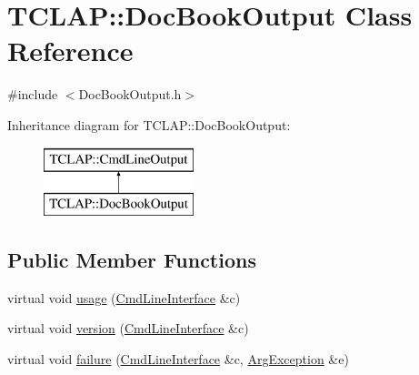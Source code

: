 \hypertarget{class_t_c_l_a_p_1_1_doc_book_output}{}\section{T\+C\+L\+A\+P\+:\+:Doc\+Book\+Output Class Reference}
\label{class_t_c_l_a_p_1_1_doc_book_output}


{\ttfamily \#include $<$Doc\+Book\+Output.\+h$>$}

Inheritance diagram for T\+C\+L\+A\+P\+:\+:Doc\+Book\+Output\+:\begin{figure}[H]
\begin{center}
\leavevmode
\includegraphics[height=2.000000cm]{class_t_c_l_a_p_1_1_doc_book_output}
\end{center}
\end{figure}
\subsection*{Public Member Functions}
\begin{DoxyCompactItemize}
\item 
virtual void \hyperlink{class_t_c_l_a_p_1_1_doc_book_output_adc1ec93f3f7e5e912690be01c5e7d6e2}{usage} (\hyperlink{class_t_c_l_a_p_1_1_cmd_line_interface}{Cmd\+Line\+Interface} \&c)
\item 
virtual void \hyperlink{class_t_c_l_a_p_1_1_doc_book_output_a3ccf7671dcae82aba5f0e91850ae25a4}{version} (\hyperlink{class_t_c_l_a_p_1_1_cmd_line_interface}{Cmd\+Line\+Interface} \&c)
\item 
virtual void \hyperlink{class_t_c_l_a_p_1_1_doc_book_output_a5e97f659fa1ab3b060a31e8bd7a0a40e}{failure} (\hyperlink{class_t_c_l_a_p_1_1_cmd_line_interface}{Cmd\+Line\+Interface} \&c, \hyperlink{class_t_c_l_a_p_1_1_arg_exception}{Arg\+Exception} \&e)
\end{DoxyCompactItemize}
